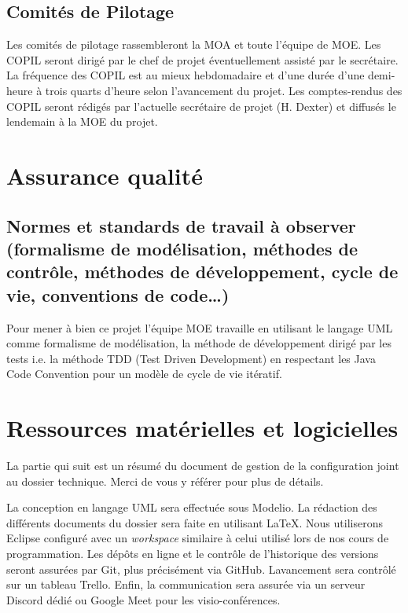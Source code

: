 \documentclass[12pt,a4paper,titlepage,openany, oneside]{report}
\begin{document}
    \subsection{Comités de Pilotage}
    Les comités de pilotage rassembleront la MOA et toute l’équipe de MOE. Les
    COPIL seront dirigé par le chef de projet éventuellement assisté par le
    secrétaire.
    \\La fréquence des COPIL est au mieux hebdomadaire et d’une durée d’une
    demi-heure à trois quarts d’heure selon l’avancement du projet.
    Les comptes-rendus des COPIL seront rédigés par l’actuelle secrétaire de
    projet (H. Dexter) et diffusés le lendemain à la MOE du projet.


    \section{Assurance qualité}
    \subsection{Normes et standards de travail à observer (formalisme de modélisation, méthodes de contrôle, méthodes de développement, cycle de vie, conventions de code…)}
    Pour mener à bien ce projet l'équipe MOE travaille
    en utilisant le langage UML comme formalisme de modélisation, la méthode de
    développement dirigé par les tests i.e. la méthode TDD (Test Driven
    Development) en respectant les Java Code Convention pour un modèle de cycle
    de vie itératif.



    \section{Ressources matérielles et logicielles}
        La partie qui suit est un résumé du document de gestion de la configuration joint
        au dossier technique. Merci de vous y référer pour plus de détails.

        La conception en langage UML sera effectuée sous Modelio. La rédaction des
        différents documents du dossier sera faite en utilisant \LaTeX. Nous utiliserons
        Eclipse configuré avec un \emph{workspace} similaire à celui utilisé lors de nos
        cours de programmation. Les dépôts en ligne et le contrôle de l'historique des
        versions seront assurées par Git, plus précisément via GitHub. Lavancement sera
        contrôlé sur un tableau Trello. Enfin, la communication sera assurée via un
        serveur Discord dédié ou Google Meet pour les visio-conférences.
\end{document}
